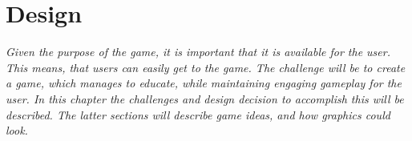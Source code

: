 \chapter{Design}
\label{cha:design}

\textit{Given the purpose of the game, it is important that it is available for the user.
This means, that users can easily get to the game.
The challenge will be to create a game, which manages to educate, while maintaining engaging gameplay for the user.
In this chapter the challenges and design decision to accomplish this will be described. The latter sections will describe game ideas, and how graphics could look.}\newpage




